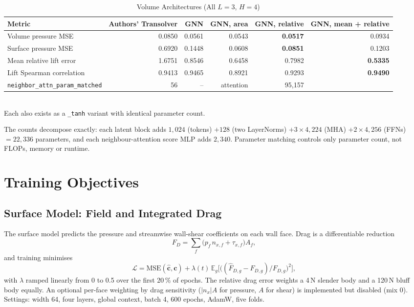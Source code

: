 \documentclass[journal]{IEEEtran}
\begin{document}
\begin{table}[!t]
\centering
\caption{Volume Architectures (All $L=3$, $H=4$)}
\label{tab:archs}
\setlength{\tabcolsep}{3.5pt}
\begin{tabular}{lrrrrr}
\toprule
Metric & Authors' Transolver & GNN & GNN, area & GNN, relative & GNN, mean + relative \\
\midrule
Volume pressure MSE & 0.0850 & 0.0561 & 0.0543 & \textbf{0.0517} & 0.0934 \\
Surface pressure MSE & 0.6920 & 0.1448 & 0.0608 & \textbf{0.0851} & 0.1203 \\
Mean relative lift error & 1.6751 & 0.8546 & 0.6458 & 0.7982 & \textbf{0.5335} \\
Lift Spearman correlation & 0.9413 & 0.9465 & 0.8921 & 0.9293 & \textbf{0.9490} \\
\texttt{neighbor\_attn\_param\_matched} & 56 & -- & attention & 95{,}157 \\
\bottomrule
\end{tabular}\\[2pt]
\footnotesize Each also exists as a \texttt{\_tanh} variant with identical parameter count.
\end{table}

The counts decompose exactly: each latent block adds
$1{,}024$ (tokens) $+128$ (two LayerNorms) $+3\times4{,}224$ (MHA) $+2\times4{,}256$
(FFNs) $=22{,}336$ parameters, and each neighbour-attention score MLP adds
$2{,}340$. Parameter matching controls only parameter count, not FLOPs,
memory or runtime.

\section{Training Objectives}
\label{sec:losses}
\subsection{Surface Model: Field and Integrated Drag}
The surface model predicts the pressure and streamwise wall-shear coefficients
on each wall face. Drag is a differentiable reduction
\begin{equation}
F_D=\textstyle\sum_f\big(p_f\,n_{x,f}+\tau_{x,f}\big)A_f,
\end{equation}
and training minimises
\begin{equation}
\mathcal{L}=\mathrm{MSE}(\hat{\mathbf{c}},\mathbf{c})+\lambda(t)\,
\mathbb{E}_g\Big[\big((\hat F_{D,g}-F_{D,g})/F_{D,g}\big)^2\Big],
\end{equation}
with $\lambda$ ramped linearly from 0 to 0.5 over the first 20\,\% of epochs.
The relative drag error weights a 4\,N slender body and a 120\,N bluff body
equally. An optional per-face weighting by drag sensitivity ($|n_x|A$ for
pressure, $A$ for shear) is implemented but disabled (mix 0). Settings: width
64, four layers, global context, batch 4, 600 epochs, AdamW, five folds.
\end{document}
